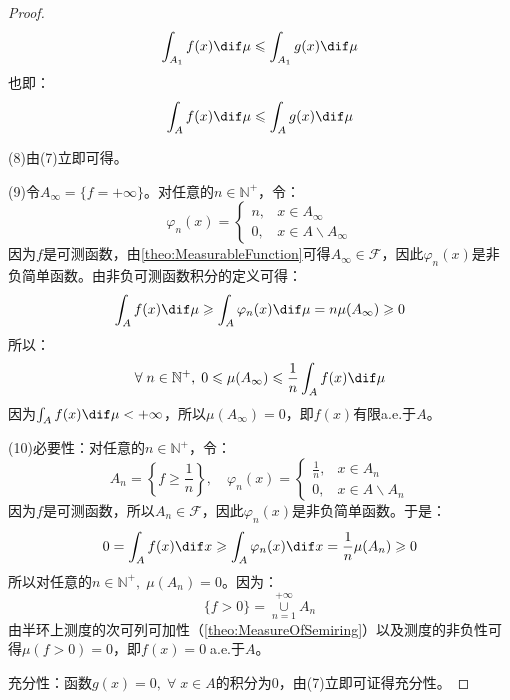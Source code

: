 \begin{proof}
	\begin{equation*}
		\int_{A_1}f(x)\dif\mu\leqslant\int_{A_1}g(x)\dif\mu
	\end{equation*}
	也即：
	\begin{equation*}
		\int_{A}f(x)\dif\mu\leqslant\int_{A}g(x)\dif\mu
	\end{equation*}\par
	(8)由(7)立即可得。\par
	(9)令$A_\infty=\{f=+\infty\}$。对任意的$n\in\mathbb{N}^+$，令：
	\begin{equation*}
		\varphi_n(x)=
		\begin{cases}
			n,&x\in A_\infty \\
			0,&x\in A\backslash A_\infty
		\end{cases}
	\end{equation*}
	因为$f$是可测函数，由\cref{theo:MeasurableFunction}可得$A_\infty\in \mathscr{F}$，因此$\varphi_n(x)$是非负简单函数。由非负可测函数积分的定义可得：
	\begin{equation*}
		\int_{A}f(x)\dif\mu\geqslant\int_{A}\varphi_n(x)\dif\mu=n\mu(A_\infty)\geqslant0
	\end{equation*}
	所以：
	\begin{equation*}
		\forall\;n\in\mathbb{N}^+,\;0\leqslant \mu(A_\infty)\leqslant\frac{1}{n}\int_{A}f(x)\dif\mu
	\end{equation*}
	因为$\int_{A}f(x)\dif\mu<+\infty$，所以$\mu(A_\infty)=0$，即$f(x)$有限a.e.于$A$。\par
	(10)必要性：对任意的$n\in\mathbb{N}^+$，令：
	\begin{equation*}
		A_n=\left\{f\geqslant\frac{1}{n}\right\},\quad
		\varphi_n(x)=
		\begin{cases}
			\frac{1}{n},&x\in A_n \\
			0,&x\in A\backslash A_n
		\end{cases}
	\end{equation*}
	因为$f$是可测函数，所以$A_n\in \mathscr{F}$，因此$\varphi_n(x)$是非负简单函数。于是：
	\begin{equation*}
		0=\int_{A}f(x)\dif x\geqslant\int_{A}\varphi_n(x)\dif x=\frac{1}{n}\mu(A_n)\geqslant0
	\end{equation*}
	所以对任意的$n\in\mathbb{N}^+,\;\mu(A_n)=0$。因为：
	\begin{equation*}
		\{f>0\}=\underset{n=1}{\overset{+\infty}{\cup}}A_n
	\end{equation*}
	由半环上测度的次可列可加性（\cref{theo:MeasureOfSemiring}）以及测度的非负性可得$\mu(f>0)=0$，即$f(x)=0\;$a.e.于$A$。\par
	充分性：函数$g(x)=0,\;\forall\;x\in A$的积分为$0$，由(7)立即可证得充分性。
\end{proof}

